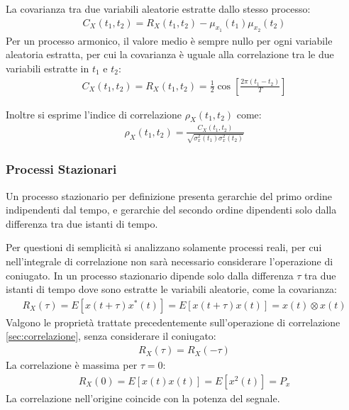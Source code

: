 \documentclass{article}
\numberwithin{equation}{subsection}
\begin{document}
La covarianza tra due variabili aleatorie estratte dallo stesso processo:
\begin{gather*}
    C_X(t_1,t_2)=R_X(t_1,t_2)-\mu_{x_1}(t_1)\mu_{x_2}(t_2)
\end{gather*}
Per un processo armonico, il valore medio è sempre nullo per ogni variabile aleatoria estratta, per cui la covarianza è uguale alla correlazione tra le due variabili 
estratte in $t_1$ e $t_2$:
\begin{gather*}
    C_X(t_1,t_2)=R_X(t_1,t_2)=\displaystyle\frac{1}{2}\cos\left[\frac{2\pi(t_1-t_2)}{T}\right]
\end{gather*} 

Inoltre si esprime l'indice di correlazione $\rho_{X}(t_1,t_2)$ come:
\begin{gather*}
    \rho_X(t_1,t_2)=\displaystyle\frac{C_X(t_1,t_2)}{\sqrt{\sigma_x^2(t_1)\sigma_x^2(t_2)}}
\end{gather*}

\subsubsection{Processi Stazionari}

Un processo stazionario per definizione presenta gerarchie del primo ordine indipendenti dal tempo, e gerarchie del secondo ordine dipendenti solo dalla differenza tra due 
istanti di tempo. 

Per questioni di semplicità si analizzano solamente processi reali, per cui nell'integrale di correlazione non sarà necessario considerare l'operazione di coniugato. In 
un processo stazionario dipende solo dalla differenza $\tau$ tra due istanti di tempo dove sono estratte le variabili aleatorie, come la covarianza:
\begin{gather*}
    R_X(\tau)=E[x(t+\tau)x^*(t)]=E[x(t+\tau)x(t)]=x(t)\otimes x(t)
\end{gather*}
Valgono le proprietà trattate precedentemente sull'operazione di correlazione \ref{sec:correlazione}, senza considerare il coniugato:
\begin{gather*}
    R_X(\tau)=R_X(-\tau)
\end{gather*} 
La correlazione è massima per $\tau=0$:
\begin{gather*}
    R_X(0)=E[x(t)x(t)]=E[x^2(t)]=P_x
\end{gather*}
La correlazione nell'origine coincide con la potenza del segnale. 
\end{document}
